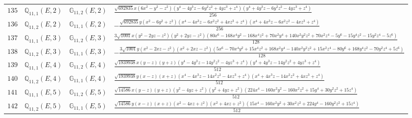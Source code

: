 \documentclass[fleqn,8pt,landscape]{jsarticle}
\begin{document}
\begin{table}[ht!]
\begin{center}
\begin{tabular}{cccl}
$ 135 $ & $ \mathbb{Q}_{11,1}(E,2) $ & $ \mathbb{G}_{11,2}(E,2) $ & $ \frac{\sqrt{692835} x \left(6 x^{2} - y^{2} - z^{2}\right) \left(y^{4} - 4 y^{3} z - 6 y^{2} z^{2} + 4 y z^{3} + z^{4}\right) \left(y^{4} + 4 y^{3} z - 6 y^{2} z^{2} - 4 y z^{3} + z^{4}\right)}{256} $ \\
$ 136 $ & $ \mathbb{Q}_{11,2}(E,2) $ & $ \mathbb{G}_{11,1}(E,2) $ & $ - \frac{\sqrt{692835} y \left(x^{2} - 6 y^{2} + z^{2}\right) \left(x^{4} - 4 x^{3} z - 6 x^{2} z^{2} + 4 x z^{3} + z^{4}\right) \left(x^{4} + 4 x^{3} z - 6 x^{2} z^{2} - 4 x z^{3} + z^{4}\right)}{256} $ \\
$ 137 $ & $ \mathbb{Q}_{11,1}(E,3) $ & $ \mathbb{G}_{11,2}(E,3) $ & $ \frac{3 \sqrt{1001} x \left(y^{2} - 2 y z - z^{2}\right) \left(y^{2} + 2 y z - z^{2}\right) \left(80 x^{6} - 168 x^{4} y^{2} - 168 x^{4} z^{2} + 70 x^{2} y^{4} + 140 x^{2} y^{2} z^{2} + 70 x^{2} z^{4} - 5 y^{6} - 15 y^{4} z^{2} - 15 y^{2} z^{4} - 5 z^{6}\right)}{128} $ \\
$ 138 $ & $ \mathbb{Q}_{11,2}(E,3) $ & $ \mathbb{G}_{11,1}(E,3) $ & $ - \frac{3 \sqrt{1001} y \left(x^{2} - 2 x z - z^{2}\right) \left(x^{2} + 2 x z - z^{2}\right) \left(5 x^{6} - 70 x^{4} y^{2} + 15 x^{4} z^{2} + 168 x^{2} y^{4} - 140 x^{2} y^{2} z^{2} + 15 x^{2} z^{4} - 80 y^{6} + 168 y^{4} z^{2} - 70 y^{2} z^{4} + 5 z^{6}\right)}{128} $ \\
$ 139 $ & $ \mathbb{Q}_{11,1}(E,4) $ & $ \mathbb{G}_{11,2}(E,4) $ & $ \frac{\sqrt{1939938} x \left(y - z\right) \left(y + z\right) \left(y^{4} - 4 y^{3} z - 14 y^{2} z^{2} - 4 y z^{3} + z^{4}\right) \left(y^{4} + 4 y^{3} z - 14 y^{2} z^{2} + 4 y z^{3} + z^{4}\right)}{512} $ \\
$ 140 $ & $ \mathbb{Q}_{11,2}(E,4) $ & $ \mathbb{G}_{11,1}(E,4) $ & $ \frac{\sqrt{1939938} y \left(x - z\right) \left(x + z\right) \left(x^{4} - 4 x^{3} z - 14 x^{2} z^{2} - 4 x z^{3} + z^{4}\right) \left(x^{4} + 4 x^{3} z - 14 x^{2} z^{2} + 4 x z^{3} + z^{4}\right)}{512} $ \\
$ 141 $ & $ \mathbb{Q}_{11,1}(E,5) $ & $ \mathbb{G}_{11,2}(E,5) $ & $ \frac{\sqrt{14586} x \left(y - z\right) \left(y + z\right) \left(y^{2} - 4 y z + z^{2}\right) \left(y^{2} + 4 y z + z^{2}\right) \left(224 x^{4} - 160 x^{2} y^{2} - 160 x^{2} z^{2} + 15 y^{4} + 30 y^{2} z^{2} + 15 z^{4}\right)}{512} $ \\
$ 142 $ & $ \mathbb{Q}_{11,2}(E,5) $ & $ \mathbb{G}_{11,1}(E,5) $ & $ \frac{\sqrt{14586} y \left(x - z\right) \left(x + z\right) \left(x^{2} - 4 x z + z^{2}\right) \left(x^{2} + 4 x z + z^{2}\right) \left(15 x^{4} - 160 x^{2} y^{2} + 30 x^{2} z^{2} + 224 y^{4} - 160 y^{2} z^{2} + 15 z^{4}\right)}{512} $ \\

\end{tabular}
\end{center}
\end{table}
\end{document}
